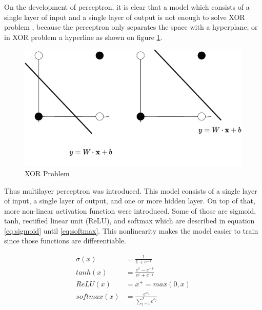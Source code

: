     On the development of perceptron, it is clear that a model
    which consists of a single layer of input and a single layer of output
    is not enough to solve XOR problem
    \citep{Goodfellow-et-al-2016}, because the perceptron only separates 
    the space with a hyperplane, or in XOR problem a
    hyperline as shown on figure \ref{fig:xor}. 
    \begin{figure}
        \centering
        \includegraphics[width=.7\linewidth]{images/xor.pdf}
        \caption{XOR Problem}
        \label{fig:xor}
    \end{figure}
    Thus multilayer perceptron was introduced. This model consists of
    a single layer of input, a single layer of output, and one or more
    hidden layer. On top of that, more non-linear activation function
    were introduced. Some of those are sigmoid, tanh, rectified linear
    unit (ReLU), and softmax which are described in equation \ref{eq:sigmoid}
    until \ref{eq:softmax}. This nonlinearity makes the model easier
    to train since those functions are differentiable.

    \begin{align}
        \label{eq:sigmoid}
        \sigma(x) &= \frac{1}{1+e^{-x}} \\
        \label{eq:tanh}
        tanh(x) &= \frac{e^x-e^{-x}}{e^x + e^{-x}}\\
        \label{eq:relu}
        ReLU(x) &= x^+ = max(0, x)\\
        \label{eq:softmax}
        softmax(x) &= \frac{e^{x_i}}{\sum_{j=1}^J e^{x_j}}
    \end{align}

